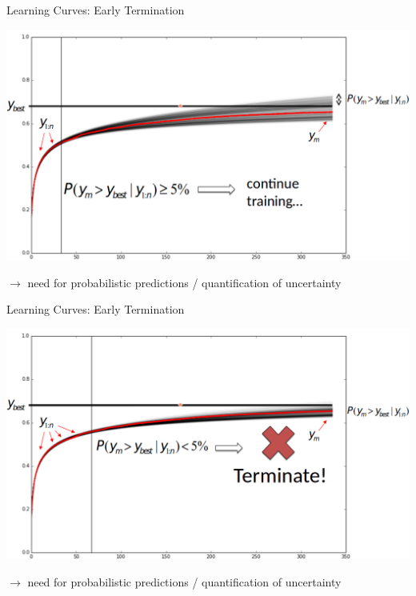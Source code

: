 \begin{frame}[c,fragile]{Learning Curves: Early Termination}

\centering
\includegraphics[width=\textwidth]{images/learning_curve_dec}

$\rightarrow$ need for probabilistic predictions / quantification of uncertainty

\end{frame}
\begin{frame}[c,fragile]{Learning Curves: Early Termination}

\centering
\includegraphics[width=\textwidth]{images/learning_curve_dec2}

$\rightarrow$ need for probabilistic predictions / quantification of uncertainty

\end{frame}


